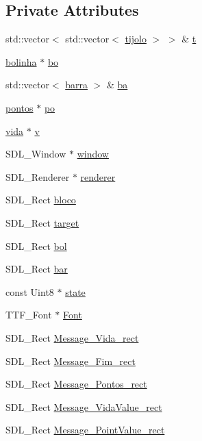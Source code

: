 \subsection*{Private Attributes}
\begin{DoxyCompactItemize}
\item 
std\+::vector$<$ std\+::vector$<$ \hyperlink{classtijolo}{tijolo} $>$ $>$ \& \hyperlink{classview_adf9164a1a6940c4224d67b5c33424f10}{t}
\item 
\hyperlink{classbolinha}{bolinha} $\ast$ \hyperlink{classview_a9d44d190dd69b906bfeaac4559ee454e}{bo}
\item 
std\+::vector$<$ \hyperlink{classbarra}{barra} $>$ \& \hyperlink{classview_a38f555c4b8b985a9788a4196f5be917f}{ba}
\item 
\hyperlink{classpontos}{pontos} $\ast$ \hyperlink{classview_a8dc345a9799a79220ecca66c4cd3e8ff}{po}
\item 
\hyperlink{classvida}{vida} $\ast$ \hyperlink{classview_ae0f8e281f5f7937d84f435437ce03546}{v}
\item 
S\+D\+L\+\_\+\+Window $\ast$ \hyperlink{classview_ade09c2dbabd1bf59ffaf625156c514f0}{window}
\item 
S\+D\+L\+\_\+\+Renderer $\ast$ \hyperlink{classview_a8d7b3ec0a0641d24cdc3b04949f5df45}{renderer}
\item 
S\+D\+L\+\_\+\+Rect \hyperlink{classview_ae22fb0558e890ff6ace089b603e2d6d8}{bloco}
\item 
S\+D\+L\+\_\+\+Rect \hyperlink{classview_a49a628eedba666db008f8c07b96e3a51}{target}
\item 
S\+D\+L\+\_\+\+Rect \hyperlink{classview_a72e360ef18105e2c565f17be3768027d}{bol}
\item 
S\+D\+L\+\_\+\+Rect \hyperlink{classview_a9c94bf9b55b5c24c5a9289d82a969ebb}{bar}
\item 
const Uint8 $\ast$ \hyperlink{classview_a6fd7fc350d9ad94dfd47e324b107e8ce}{state}
\item 
T\+T\+F\+\_\+\+Font $\ast$ \hyperlink{classview_ad17acebf948f7f42aa7cb8f88a38fe21}{Font}
\item 
S\+D\+L\+\_\+\+Rect \hyperlink{classview_af1b48d8a8f7f9e16800f9d842717ed2c}{Message\+\_\+\+Vida\+\_\+rect}
\item 
S\+D\+L\+\_\+\+Rect \hyperlink{classview_aba853e73ed61ec0078ff6e56bb57e702}{Message\+\_\+\+Fim\+\_\+rect}
\item 
S\+D\+L\+\_\+\+Rect \hyperlink{classview_ada3fc542a5e8b9d9e002665b37af781b}{Message\+\_\+\+Pontos\+\_\+rect}
\item 
S\+D\+L\+\_\+\+Rect \hyperlink{classview_a1a7059536cb8e091ff7d4a4f2526bcce}{Message\+\_\+\+Vida\+Value\+\_\+rect}
\item 
S\+D\+L\+\_\+\+Rect \hyperlink{classview_ade4cd2992600a54f7cb1f9f20876cd75}{Message\+\_\+\+Point\+Value\+\_\+rect}
\end{DoxyCompactItemize}


